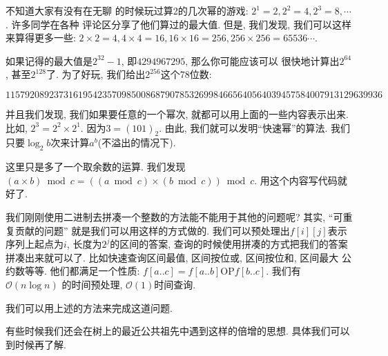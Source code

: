  不知道大家有没有在无聊
的时候玩过算2的几次幂的游戏: $2^1=2, 2^2=4, 2^3=8, \cdots$. 许多同学在各种
评论区分享了他们算过的最大值. 但是, 我们发现, 我们可以这样来算得更多一些: 
$2\times 2=4, 4\times 4 = 16, 16\times 16=256, 256\times 256=65536\cdots$. 

如果记得的最大值是$2^{32}-1$, 即$4294967295$, 那么你可能应该可以
很快地计算出$2^{64}$, 甚至$2^{128}$了. 为了好玩, 我们给出$2^{256}$这个78位数: 

$$
115792089237316195423570985008687907853269984665640564039457584007913129639936
$$

并且我们发现, 我们如果要任意的一个幂次, 就都可以用上面的一些内容表示出来. 比如, $2^3=2^2\times 2^1$.
因为$3=(101)_2$. 由此, 我们就可以发明``快速幂''的算法. 我们只要$\log_2 b$次来计算$a^b$(不溢出的情况下).

 这里只是多了一个取余数的运算. 我们发现
$(a\times b)\bmod c = ((a\bmod c)\times (b\bmod c))\bmod c$. 用这个内容写代码就好了. 


  我们刚刚使用二进制去拼凑一个整数的方法能不能用于其他的问题呢? 其实, ``可重复贡献的问题''
就是我们可以用这样的方式做的. 我们可以预处理出$f[i][j]$表示序列上起点为$i$, 长度为$2^j$的区间的答案, 
查询的时候使用拼凑的方式把我们的答案拼凑出来就可以了. 比如快速查询区间最值, 区间按位或, 区间按位和, 区间最大
公约数等等. 他们都满足一个性质: $f[a..c] = f[a..b] \text{OP} f[b..c]$. 我们有$\mathcal O(n\log n)$
的时间预处理, $\mathcal O(1)$时间查询. 

 我们可以用上述的方法来完成这道问题. 

有些时候我们还会在树上的最近公共祖先中遇到这样的倍增的思想. 具体我们可以到时候再了解. 

